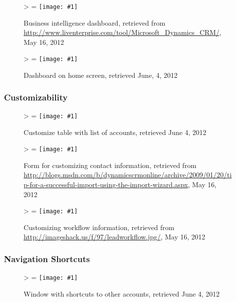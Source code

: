 \documentclass[12pt,letterpaper]{article}
\newlength{\imgwidth}
\newlength{\imgheight}
\newlength{\finalwidth}
\newlength{\finalheight}
\newlength{\imgtextheight}
\newcommand\scalegraphics[1]{%
	\settowidth{\imgwidth}{\texttt{[image: \#1]}}%
	\settoheight{\imgheight}{\texttt{[image: \#1]}}%
	\ifnum\imgwidth>\imgheight \def\imgangle{90} \else \def\imgangle{0} \fi%
	\setlength{\imgtextheight}{0.74\textheight}%
	\setlength{\finalwidth}{\minof{\imgwidth}{\textwidth}}%
	\setlength{\finalheight}{\minof{\imgheight}{\imgtextheight}}%
	\ifnum\finalwidth=\imgwidth \def\imgangle{0} \fi%
	\texttt{[image: \#1]}%
}
\newcommand{\downloadDate}{May 16, 2012}
\begin{document}
\begin{figure}[htbp]
	\centering
	\scalegraphics{./img/dynamics/screen_msft_dashboard}
	\caption[Microsoft Dynamics CRM: Business intelligence dashboard]{Business intelligence dashboard, retrieved from \url{http://www.liventerprise.com/tool/Microsoft_Dynamics_CRM/}, \downloadDate}
\end{figure}

\begin{figure}[htbp]
	\centering
	\scalegraphics{./img/dynamics/msft_home_screen}
	\caption[Microsoft Dynamics CRM: Dashboard on home screen]{Dashboard on home screen, retrieved June, 4, 2012}
\end{figure}

\newpage
\FloatBarrier
\subsubsection{Customizability}

\begin{figure}[htbp]
	\centering
	\scalegraphics{./img/dynamics/msft_customize_table}
	\caption[Microsoft Dynamics CRM: Customize table with list of accounts]{Customize table with list of accounts, retrieved June 4, 2012}
\end{figure}

\begin{figure}[htbp]
	\centering
	\scalegraphics{./img/dynamics/screen_msft_contact_detail2}
	\caption[Microsoft Dynamics CRM: Form for customizing contact information]{Form for customizing contact information, retrieved from \url{http://blogs.msdn.com/b/dynamicscrmonline/archive/2009/01/20/tip-for-a-successful-import-using-the-import-wizard.aspx}, \downloadDate}
\end{figure}

\begin{figure}[htbp]
	\centering
	\scalegraphics{./img/dynamics/screen_msft_workflow}
	\caption[Microsoft Dynamics CRM: Customizing workflow information]{Customizing workflow information, retrieved from \url{http://imageshack.us/f/97/leadworkflow.jpg/}, \downloadDate}
\end{figure}

\newpage
\FloatBarrier
\subsubsection{Navigation Shortcuts}

\begin{figure}[htbp]
	\centering
	\scalegraphics{./img/dynamics/msft_account_shortcuts}
	\caption[Microsoft Dynamics CRM: Window with shortcuts to other accounts]{Window with shortcuts to other accounts, retrieved June 4, 2012}
\end{figure}
\end{document}
